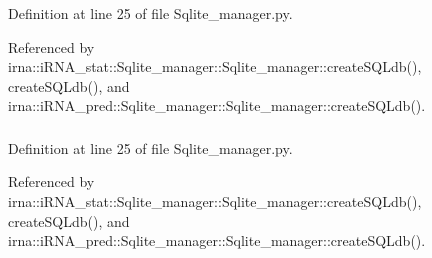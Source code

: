 \-Definition at line 25 of file \-Sqlite\-\_\-manager.\-py.



\-Referenced by irna\-::i\-R\-N\-A\-\_\-stat\-::\-Sqlite\-\_\-manager\-::\-Sqlite\-\_\-manager\-::create\-S\-Q\-Ldb(), create\-S\-Q\-Ldb(), and irna\-::i\-R\-N\-A\-\_\-pred\-::\-Sqlite\-\_\-manager\-::\-Sqlite\-\_\-manager\-::create\-S\-Q\-Ldb().

\hypertarget{classirna_1_1David2tulip_1_1Sqlite__manager_1_1Sqlite__manager_aaf3093f83fe837954b733f5d24783298}{
\subsubsection[{db\-\_\-path}]{}}
\label{classirna_1_1David2tulip_1_1Sqlite__manager_1_1Sqlite__manager_aaf3093f83fe837954b733f5d24783298}


\-Definition at line 25 of file \-Sqlite\-\_\-manager.\-py.



\-Referenced by irna\-::i\-R\-N\-A\-\_\-stat\-::\-Sqlite\-\_\-manager\-::\-Sqlite\-\_\-manager\-::create\-S\-Q\-Ldb(), create\-S\-Q\-Ldb(), and irna\-::i\-R\-N\-A\-\_\-pred\-::\-Sqlite\-\_\-manager\-::\-Sqlite\-\_\-manager\-::create\-S\-Q\-Ldb().

\hypertarget{classirna_1_1David2tulip_1_1Sqlite__manager_1_1Sqlite__manager_ae9aa2f3e8a0e6df55e14a6e275b07d9f}{
\subsubsection[{fastmode}]{}}
\label{classirna_1_1David2tulip_1_1Sqlite__manager_1_1Sqlite__manager_ae9aa2f3e8a0e6df55e14a6e275b07d9f}


